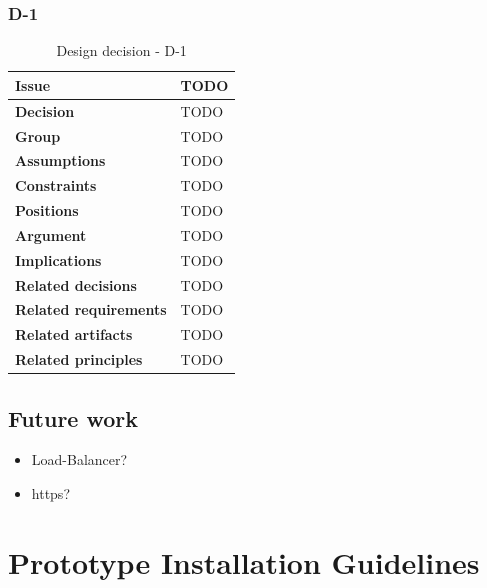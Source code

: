 \documentclass[11pt]{article}
\begin{document}
\newpage

\subsubsection{D-1}

\begin{table}[h] \small
	\begin{tabularx}{\textwidth}{ | l | X |}
    	\hline
	\cellcolor[gray]{0.9}
    	\textbf{Issue} & TODO \\
	\hline
	\cellcolor[gray]{0.9}
	\textbf{Decision} & TODO \\ 
	\hline
	\cellcolor[gray]{0.9}
	\textbf{Group} & TODO \\ 
	\hline
	\cellcolor[gray]{0.9}
	\textbf{Assumptions} & TODO \\ 
	\hline
	\cellcolor[gray]{0.9}
	\textbf{Constraints} & TODO \\ 
	\hline
	\cellcolor[gray]{0.9}
	\textbf{Positions} & TODO \\ 
	\hline
	\cellcolor[gray]{0.9}
	\textbf{Argument} & TODO \\ 
	\hline
	\cellcolor[gray]{0.9}
	\textbf{Implications} & TODO \\ 
	\hline
	\cellcolor[gray]{0.9}
	\textbf{Related decisions} & TODO \\ 
	\hline
	\cellcolor[gray]{0.9}
	\textbf{Related requirements} & TODO\\
	\hline
	\cellcolor[gray]{0.9}
	\textbf{Related artifacts} & TODO\\
	\hline
	\cellcolor[gray]{0.9}
	\textbf{Related principles} & TODO\\
	\hline
	\end{tabularx}
	\caption{Design decision - D-1}
	\label{dec:D1}
\end{table}

\subsection{Future work}

\begin{itemize}
\item Load-Balancer?
\item https?
\end{itemize}

\section{Prototype Installation Guidelines}
\end{document}
